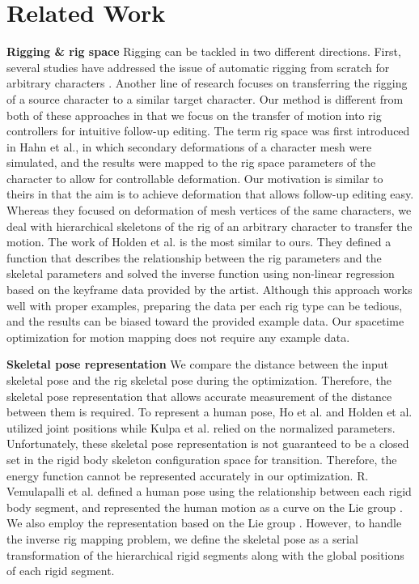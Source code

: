 \section{Related Work}
\textbf{Rigging \& rig space}
Rigging can be tackled in two different directions. First, several studies have addressed the issue of automatic rigging from scratch for arbitrary characters \cite{baran2007automatic,borosan2012rigmesh,bang2015interactive}. Another line of research focuses on transferring the rigging of a source character to a similar target character\cite{poirier2009rig,seo2010rigging}. Our method is different from both of these approaches in that we focus on the transfer of motion into rig controllers for intuitive follow-up editing.
The term rig space was first introduced in Hahn et al., in which secondary deformations of a character mesh were simulated, and the results were mapped to the rig space parameters of the character to allow for controllable deformation. Our motivation is similar to theirs in that the aim is to achieve deformation that allows follow-up editing easy. Whereas they focused on deformation of mesh vertices of the same characters, we deal with hierarchical skeletons of the rig of an arbitrary character to transfer the motion.
The work of Holden et al. is the most similar to ours. They defined a function that describes the relationship between the rig parameters and the skeletal parameters and solved the inverse function using non-linear regression based on the keyframe data provided by the artist. Although this approach works well with proper examples, preparing the data per each rig type can be tedious, and the results can be biased toward the provided example data. Our spacetime optimization for motion mapping does not require any example data.

\textbf{Skeletal pose representation}
We compare the distance between the input skeletal pose and the rig skeletal pose during the optimization. Therefore, the skeletal pose representation that allows accurate measurement of the distance between them is required. To represent a human pose, Ho et al. and Holden et al. utilized joint positions while Kulpa et al. relied on the normalized parameters. Unfortunately, these skeletal pose representation is not guaranteed to be a closed set in the rigid body skeleton configuration space for transition. Therefore, the energy function cannot be represented accurately in our optimization. R. Vemulapalli et al. defined a human pose using the relationship between each rigid body segment, and represented the human motion as a curve on the Lie group \SE{}. We also employ the representation based on the Lie group \SE{}. However, to handle the inverse rig mapping problem, we define the skeletal pose as a serial transformation of the hierarchical rigid segments along with the global positions of each rigid segment.

